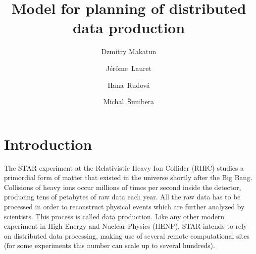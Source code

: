 \documentclass{svjour3}                     %
\begin{document}
\title{Model for planning of distributed data production}

\author{Dzmitry Makatun         \and
		J\'er\^ome~Lauret		\and
		Hana~Rudov\'a			\and
		Michal~\v{S}umbera	
}


\maketitle
\section{Introduction}
\label{intro}
The STAR experiment at the Relativistic Heavy Ion Collider (RHIC) studies a
primordial form of matter that existed in the universe shortly after the Big
Bang. Collisions of heavy ions occur millions of times per second inside the
detector, producing tens of petabytes of raw data each year. All the raw data
has to be processed in order to reconstruct physical events which are
further analyzed by scientists. This process is called data production.  Like
any other modern experiment in High Energy and Nuclear Physics (HENP), STAR intends to rely on
distributed data processing, making use of several remote computational sites
(for some experiments this number can scale up to several hundreds).
\end{document}

